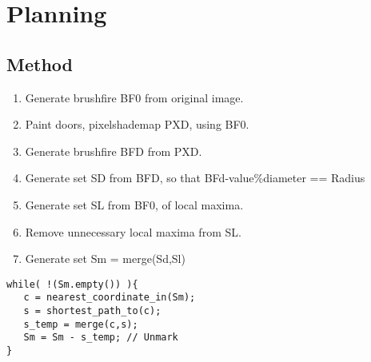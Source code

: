 \section{Planning}
\subsection{Method}

\begin{enumerate}
\item Generate brushfire BF0 from original image.
\item Paint doors, pixelshademap PXD, using BF0.
\item Generate brushfire BFD from PXD. 
\item Generate set SD from BFD, so that BFd-value\%diameter == Radius
\item Generate set SL from BF0, of local maxima. 
\item Remove unnecessary local maxima from SL.
\item Generate set Sm = merge(Sd,Sl)
\end{enumerate}

\begin{verbatim}
while( !(Sm.empty()) ){
   c = nearest_coordinate_in(Sm);
   s = shortest_path_to(c);
   s_temp = merge(c,s);
   Sm = Sm - s_temp; // Unmark
}
\end{verbatim}


